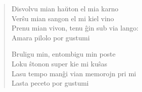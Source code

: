\begin{verse}
    Disvolvu mian haŭton el mia karno\\
    Verŝu mian sangon el mi kiel vino\\
    Prenu mian vivon, tenu ĝin sub via lango:\\
    \vin Amara pilolo por gustumi

    Bruligu min, entombigu min poste\\
    Loku ŝtonon super kie mi kuŝas\\
    Lasu tempo manĝi vian memorojn pri mi\\
    \vin Lasta peceto por gustumi
\end{verse}
